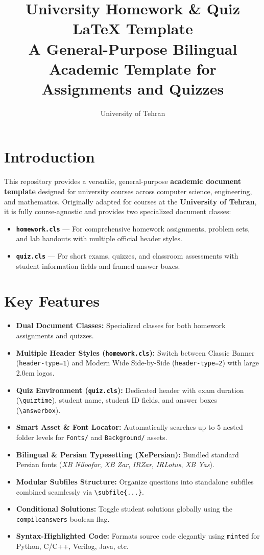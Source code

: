 \documentclass[10pt,a4paper]{article}
\title{\textbf{University Homework \& Quiz \LaTeX{} Template}\\[0.25em]\large A General-Purpose Bilingual Academic Template for Assignments and Quizzes}
\author{University of Tehran}
\date{}
\begin{document}
\maketitle

\section{Introduction}
This repository provides a versatile, general-purpose \textbf{academic document template} designed for university courses across computer science, engineering, and mathematics. Originally adapted for courses at the \textbf{University of Tehran}, it is fully course-agnostic and provides two specialized document classes:
\begin{itemize}[leftmargin=1.5em, itemsep=0.2em]
    \item \textbf{\texttt{homework.cls}} --- For comprehensive homework assignments, problem sets, and lab handouts with multiple official header styles.
    \item \textbf{\texttt{quiz.cls}} --- For short exams, quizzes, and classroom assessments with student information fields and framed answer boxes.
\end{itemize}

\section{Key Features}
\begin{itemize}[leftmargin=1.5em, itemsep=0.2em]
    \item \textbf{Dual Document Classes:} Specialized classes for both homework assignments and quizzes.
    \item \textbf{Multiple Header Styles (\texttt{homework.cls}):} Switch between Classic Banner (\texttt{header-type=1}) and Modern Wide Side-by-Side (\texttt{header-type=2}) with large 2.0cm logos.
    \item \textbf{Quiz Environment (\texttt{quiz.cls}):} Dedicated header with exam duration (\texttt{\textbackslash quiztime}), student name, student ID fields, and answer boxes (\texttt{\textbackslash answerbox}).
    \item \textbf{Smart Asset \& Font Locator:} Automatically searches up to 5 nested folder levels for \texttt{Fonts/} and \texttt{Background/} assets.
    \item \textbf{Bilingual \& Persian Typesetting (XePersian):} Bundled standard Persian fonts (\textit{XB Niloofar}, \textit{XB Zar}, \textit{IRZar}, \textit{IRLotus}, \textit{XB Yas}).
    \item \textbf{Modular Subfiles Structure:} Organize questions into standalone subfiles combined seamlessly via \texttt{\textbackslash subfile\{...\}}.
    \item \textbf{Conditional Solutions:} Toggle student solutions globally using the \texttt{compileanswers} boolean flag.
    \item \textbf{Syntax-Highlighted Code:} Formats source code elegantly using \texttt{minted} for Python, C/C++, Verilog, Java, etc.
\end{itemize}
\end{document}
